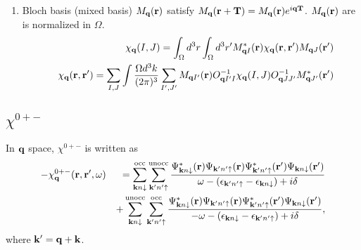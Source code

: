 \documentclass[a4paper,10pt,epsf,fleqn]{article}
\newcommand{\bfq}{{\bf q}}
\newcommand{\bfk}{{\bf k}}
\newcommand{\bfr}{{\bf r}}
\newcommand{\bfT}{{\bf T}}
\newcommand{\ispone}{\downarrow}
\newcommand{\isptwo}{\uparrow}
\begin{document}
\begin{enumerate}
\item Bloch basis (mixed basis) $M_\bfq (\bfr)$ satisfy
$M_\bfq (\bfr + \bfT) = M_\bfq(\bfr) e^{i \bfq \bfT}$.
$M_\bfq (\bfr)$ are is normalized in $\Omega$.
\begin{eqnarray}
&& \chi_\bfq(I,J) = 
\int_\Omega d^3r \int_\Omega d^3r' M^*_{\bfq I} (\bfr) \chi_\bfq(\bfr,\bfr') M_{\bfq J} (\bfr')\\
&&\chi_\bfq(\bfr, \bfr') = 
\sum_{I,J} \int \frac{\Omega d^3 k}{(2 \pi)^3} 
\sum_{I',J'} M_{\bfq I'}(\bfr) O^{-1}_{\bfq I' I}\chi_\bfq(I,J) O^{-1}_{\bfq J J'}  M^*_{\bfq J'}(\bfr')
\end{eqnarray}

\end{enumerate}


\subsection{$\chi^{0+-}$}
In $\bfq$ space, $\chi^{0+-}$ is written as
\begin{eqnarray}
- \chi^{0+-}_\bfq(\bfr,\bfr',\omega) 
&&=
 \sum^{\rm  occ}_{\bfk n \ispone} \sum^{\rm unocc}_{\bfk' n'\isptwo}
\frac{
\Psi_{\bfk n\ispone}^*(\bfr)      \Psi_{\bfk' n'\isptwo}(\bfr)
\Psi_{\bfk' n'\isptwo}^*(\bfr') \Psi_{\bfk n\ispone}(\bfr') 
}{\omega-(\epsilon_{\bfk' n'\isptwo}-\epsilon_{\bfk n\ispone})+i \delta} \nonumber\\
&&+ \sum^{\rm  unocc}_{\bfk n \ispone} \sum^{\rm occ}_{\bfk' n'\isptwo}
\frac{
\Psi_{\bfk n\ispone}^*(\bfr)      \Psi_{\bfk' n'\isptwo}(\bfr)
\Psi_{\bfk' n'\isptwo}^*(\bfr') \Psi_{\bfk n\ispone}(\bfr') 
}{-\omega-(\epsilon_{\bfk n\ispone}-\epsilon_{\bfk' n'\isptwo})+i \delta},
\label{generalchi01q}
\end{eqnarray}
where $\bfk' = \bfq+ \bfk$. 
\end{document}
